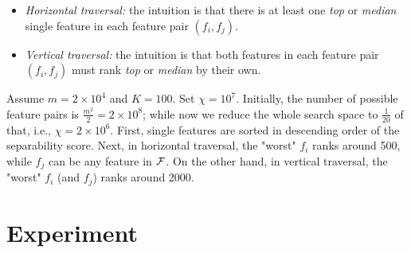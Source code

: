 \begin{itemize}
\item \emph{Horizontal traversal:} the intuition is that there is at least one {\em top} or {\em median} single feature in each \topk feature pair $(f_i,f_j)$.
\item \emph{Vertical traversal:}  the intuition is that both features in each \topk feature pair $(f_i,f_j)$ must rank {\em top} or {\em median} by their own.
\end{itemize}



\begin{example}[\traversal]
Assume $m=2\times 10^4$ and $K=100$. Set $\chi=10^7$. Initially, the number of possible feature pairs is $\frac{m^2}{2}=2\times 10^8$; while now we reduce the whole search space to  $\frac{1}{20}$ of that,  i.e., $\chi=2\times 10^6$. First, single features are sorted in descending order of the separability score. Next, in horizontal traversal, the "worst" $f_i$ ranks around 500, while $f_j$ can be any feature in $\ff$. On the other hand, in vertical traversal, the "worst" $f_i$ (and $f_j$) ranks around 2000.
\end{example}
\section{Experiment}
\label{sec:exp}








